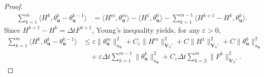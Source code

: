\documentclass{amsart}
\begin{document}
\begin{proof}
\[\begin{aligned}
\sum_{k=1}^m
\langle H^k,\theta_{\boldsymbol u}^k-\theta_{\boldsymbol u}^{k-1}\rangle
&=
\langle H^m,\theta_{\boldsymbol u}^m\rangle
- 
\langle H^1,\theta_{\boldsymbol u}^0\rangle
-
\sum_{k=1}^{m-1}
\langle H^{k+1}-H^k,\theta_{\boldsymbol u}^k\rangle.
\end{aligned}
\]
Since
$H^{k+1}-H^k=\Delta t F^{k+1}$, Young's inequality yields, for any
$\varepsilon>0$,
%
\begin{align}
\label{eq:H-term-direct}
\sum_{k=1}^m
\langle H^k,\theta_{\boldsymbol u}^k-\theta_{\boldsymbol u}^{k-1}\rangle
&\le
\varepsilon\|\theta_{\boldsymbol u}^m\|_{a_{\boldsymbol u}}^2
+
C_\varepsilon\|H^m\|_{\boldsymbol V_h'}^2 + C \|H^1\|_{\boldsymbol{V}_h'}^2 + C \| \theta_{\boldsymbol{u}}^0\|_{a_{\boldsymbol{u}}}^2
\\
&\quad
+
\varepsilon\Delta t
\sum_{k=1}^{m-1}
\|\theta_{\boldsymbol u}^k\|_{a_{\boldsymbol u}}^2
+
C_\varepsilon\Delta t
\sum_{k=2}^{m}
\|F^k\|_{\boldsymbol V_h'}^2 .
\nonumber
\end{align}


\end{proof}
\end{document}
